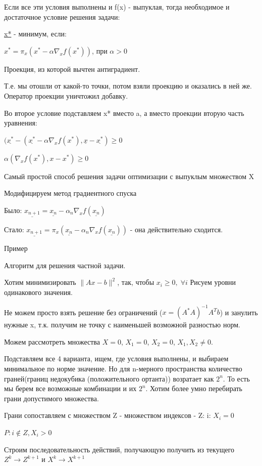 \documentclass[a4paper, 12pt]{article}
\begin{document}
	Если все эти условия выполнены и f(x) - выпуклая, тогда необходимое и достаточное условие решения задачи:
	
	\underline{x*} - минимум, если:
	
	$x^* = \pi_x(x^* - \alpha\nabla_xf(x^*))$, при $\alpha>0$
	
	Проекция, из которой вычтен антиградиент.
	
	Т.е. мы отошли от какой-то точки, потом взяли проекцию и оказались в ней же. Оператор проекции уничтожил добавку.
	
	Во второе условие подставляем x* вместо a, а вместо проекции вторую часть уравнения:
	
	$(\underline{x^*} - (\underline{x^*} - \alpha\nabla_xf(x^*), \underline{x}- \underline{x^*}) \geq 0$
	
	$\alpha (\nabla_xf(x^*), x-x^*) \geq 0$
	
	Самый простой способ решения задачи оптимизации с выпуклым множеством X
	
	Модифицируем метод градиентного спуска
	
	Было: $\underline{x_{n+1}} = \underline{x_n} - \alpha_n\nabla_x f(\underline{x_n})$
	
	Стало: $\underline{x_{n+1}} = \pi_x (\underline{x_n} - \alpha_n\nabla_x f(\underline{x_n}))$ - она действительно сходится.
	
	Пример
	
	Алгоритм для решения частной задачи. 
	
	Хотим минимизировать $\|Ax - b\|^2$, так, чтобы $x_i \geq 0,\; \forall i$
	Рисуем уровни одинакового значения.
	
	Не можем просто взять решение без ограничений ($x = (A^*A)^{-1} A^T b$) и занулить нужные x, т.к. получим не точку с наименьшей возможной разностью норм.
	
	Можем рассмотреть множества $X = 0$, $X_1 = 0$, $X_2 = 0$, $X_1, X_2 \neq 0$.
	
	Подставляем все 4 варианта, ищем, где условия выполнены, и выбираем минимальное по норме значение. Но для n-мерного пространства количество граней(границ недокубика (положительного ортанта)) возратает как $2^n$. То есть мы берем все возможные комбинации и их $2^n$. Хотим более умно перебирать грани допустимого множества. 
	
	Грани сопоставляем с множеством Z - множеством индексов - Z: i: $X_i = 0$
	
	$P: i\notin Z, X_i > 0$
	
	Строим последовательность действий, получающую получить из текущего $Z^k \rightarrow Z^ {k+1}$ и $X^k \rightarrow X^ {k+1}$
	
\end{document}
